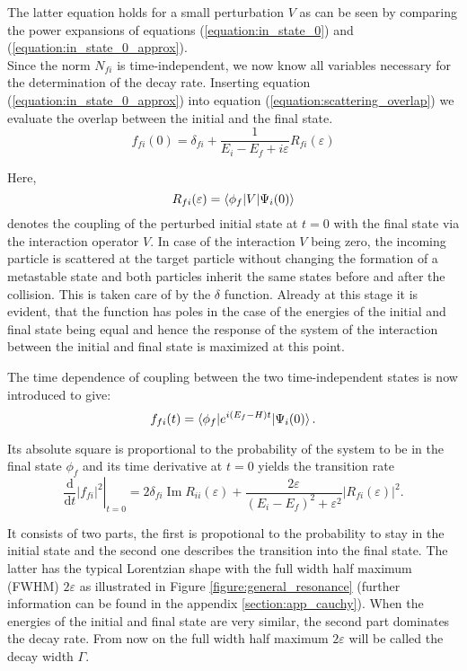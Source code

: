 The latter equation holds for a small perturbation $V$ as can be seen by comparing
the power expansions of equations (\ref{equation:in_state_0}) and
(\ref{equation:in_state_0_approx}).\\
Since the norm $N_{fi}$ is time-independent, we now know all variables
necessary for the determination of the decay rate.
Inserting equation (\ref{equation:in_state_0_approx}) into equation
(\ref{equation:scattering_overlap}) we evaluate the overlap between the initial
and the final state.
\begin{equation}
  f_{fi}(0) = \delta_{fi} + \frac{1}{E_i-E_f+i\varepsilon} R_{fi}(\varepsilon)
\end{equation}

Here, 
\begin{equation}
  R_{fi}(\varepsilon) = \braket{\phi_f|V|\Psi_i(0)}
\end{equation}
denotes the coupling of the perturbed initial state at $t=0$ with the
final state via the interaction
operator $V$. In case of the interaction $V$ being zero, the incoming particle
is scattered at the target particle without changing the formation of a metastable
state and both particles inherit the same states before and after the collision.
This is taken care of by the $\delta$ function. Already at this stage it is evident,
that the function has
poles in the case of the energies of the initial and final state being equal
and hence the response of the system of the interaction between the initial and final
state is maximized at this point.

The time dependence of coupling between the two time-independent states is now
introduced to give:
\begin{equation}
  f_{fi}(t) = \braket{\phi_f| e^{i(E_f-H)t} |\Psi_i(0)} .
\end{equation}

Its absolute square is proportional to the probability of the system to be
in the final state $\phi_f$ and its time derivative at $t=0$ yields the
transition rate
\begin{equation}
  \left . \frac{\mathrm{d}}{\mathrm{d}t} |f_{fi}|^2 \right |_{t=0}
  = 2\delta_{fi} \operatorname{Im}R_{ii}(\varepsilon) 
    + \frac{2\varepsilon}{(E_i-E_f)^2+\varepsilon^2} |R_{fi}(\varepsilon)|^2 .
\end{equation}

It consists of two parts, the first is propotional to the probability to stay
in the initial state and the second one describes the transition into the
final state. The latter has the typical Lorentzian shape with the full width
half maximum
(FWHM) $2 \varepsilon$ as illustrated in Figure \ref{figure:general_resonance}
(further information can be found in the appendix
\ref{section:app_cauchy}). When the energies of the initial and final state
are very similar, the second part dominates the decay rate. From now on
the full width half maximum ${2\varepsilon}$ will be called the
decay width $\Gamma$.

